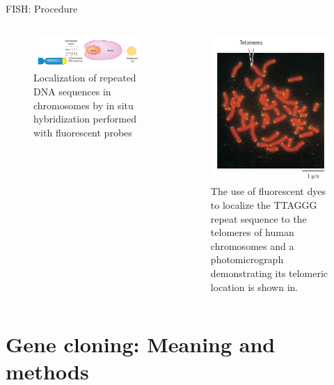 \documentclass[
  ignorenonframetext,
  aspectratio=169]{beamer}
\begin{document}
\begin{frame}{FISH: Procedure}
\protect\hypertarget{fish-procedure}{}
\begin{columns}[T,onlytextwidth]

\begin{figure}
\includegraphics[width=0.8\linewidth]{./../images/fish_hybridization1} \caption{Localization of repeated DNA sequences in chromosomes by in situ hybridization performed with fluorescent probes}\label{fig:fish-hybridization1}
\end{figure}


\begin{figure}
\includegraphics[width=0.5\linewidth]{./../images/fish_hybridization2} \caption{The use of fluorescent dyes to localize the TTAGGG repeat sequence to the telomeres of human chromosomes and a photomicrograph demonstrating its telomeric location is shown in.}\label{fig:fish-hybridization2}
\end{figure}

\end{columns}
\end{frame}

\hypertarget{gene-cloning-meaning-and-methods}{%
\section{Gene cloning: Meaning and
methods}\label{gene-cloning-meaning-and-methods}}
\end{document}
